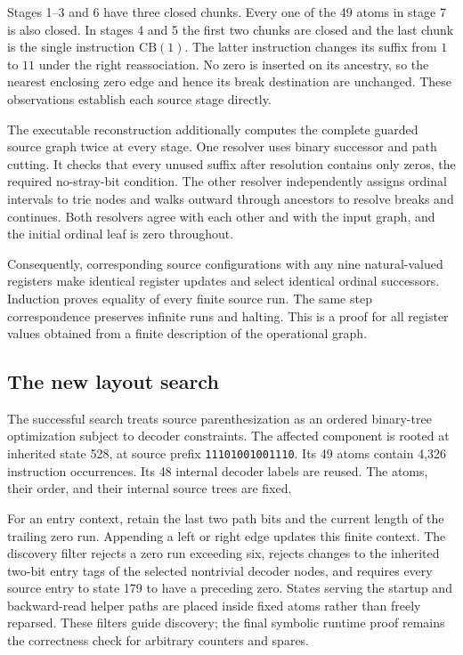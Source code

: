 Stages 1--3 and 6 have three closed chunks.  Every one of the 49 atoms in
stage 7 is also closed.  In stages 4 and 5 the first two chunks are
closed and the last chunk is the single instruction $\mathrm{CB}(1)$.
The latter instruction changes its suffix from $1$ to $11$ under the
right reassociation.  No zero is inserted on its ancestry, so the
nearest enclosing zero edge and hence its break destination are
unchanged.  These observations establish each source stage directly.

The executable reconstruction additionally computes the complete guarded
source graph twice at every stage.  One resolver uses binary successor
and path cutting.  It checks that every unused suffix after resolution
contains only zeros, the required no-stray-bit condition.  The other
resolver independently assigns ordinal intervals to trie nodes and
walks outward through ancestors to resolve breaks and continues.  Both
resolvers agree with each other and with the input graph, and the
initial ordinal leaf is zero throughout.

Consequently, corresponding source configurations with any nine
natural-valued registers make identical register updates and select
identical ordinal successors.  Induction proves equality of every finite
source run.  The same step correspondence preserves infinite runs and
halting.  This is a proof for all register values obtained from a finite
description of the operational graph.

\subsection{The new layout search}

The successful search treats source parenthesization as an ordered
binary-tree optimization subject to decoder constraints.  The affected
component is rooted at inherited state 528, at source prefix
\texttt{11101001001110}.  Its 49 atoms contain 4,326 instruction
occurrences.  Its 48 internal decoder labels are reused.  The atoms,
their order, and their internal source trees are fixed.

For an entry context, retain the last two path bits and the current
length of the trailing zero run.  Appending a left or right edge updates
this finite context.  The discovery filter rejects a zero run exceeding
six, rejects changes to the inherited two-bit entry tags of the selected
nontrivial decoder nodes, and requires every source entry to state 179
to have a preceding zero.  States serving the startup and backward-read
helper paths are placed inside fixed atoms rather than freely reparsed.
These filters guide discovery; the final symbolic runtime proof remains
the correctness check for arbitrary counters and spares.

